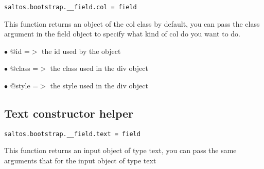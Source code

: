 \documentclass[a4paper]{book}
\begin{document}
\begin{lstlisting}
saltos.bootstrap.__field.col = field
\end{lstlisting}

This function returns an object of the col class by default, you can pass the class argument
in the field object to specify what kind of col do you want to do.

\begin{compactitem}
\item[\color{myblue}$\bullet$] @id    =$>$ the id used by the object
\item[\color{myblue}$\bullet$] @class =$>$ the class used in the div object
\item[\color{myblue}$\bullet$] @style =$>$ the style used in the div object
\end{compactitem}

\hypertarget{toc460}{}
\subsection{Text constructor helper}

\begin{lstlisting}
saltos.bootstrap.__field.text = field
\end{lstlisting}

This function returns an input object of type text, you can pass the same arguments
that for the input object of type text
\end{document}
